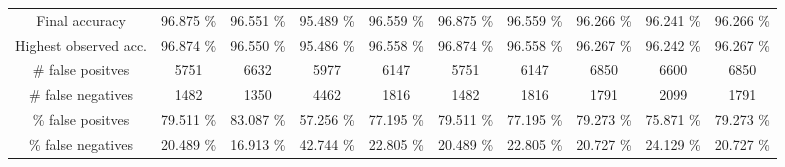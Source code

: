 \begin{table}[htb]
\begin{tabular}{@{}cccccccccc@{}}
        Final accuracy &  96.875 \% &  96.551 \% &  95.489 \% &  96.559 \% &  96.875 \% &  96.559 \% &  96.266 \% &  96.241 \% &  96.266 \% \\
        Highest observed acc. &  96.874 \% &  96.550 \% &  95.486 \% &  96.558 \% &  96.874 \% &  96.558 \% &  96.267 \% &  96.242 \% &  96.267 \% \\
        \# false positves &  5751 &  6632 &  5977 &  6147 &  5751 &  6147 &  6850 &  6600 &  6850 \\
        \# false negatives &  1482 &  1350 &  4462 &  1816 &  1482 &  1816 &  1791 &  2099 &  1791 \\
        \% false positves &  79.511 \% &  83.087 \% &  57.256 \% &  77.195 \% &  79.511 \% &  77.195 \% &  79.273 \% &  75.871 \% &  79.273 \% \\
        \% false negatives &  20.489 \% &  16.913 \% &  42.744 \% &  22.805 \% &  20.489 \% &  22.805 \% &  20.727 \% &  24.129 \% &  20.727 \% \\
        \bottomrule
    \end{tabular}
\end{table}
